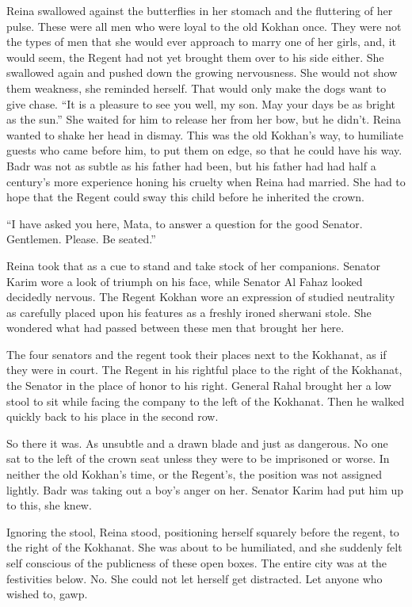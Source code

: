 \documentclass{article}
\begin{document}
	Reina swallowed against the butterflies in her stomach and the fluttering of her pulse. These were all men who were loyal to the old Kokhan once. They were not the types of men that she would ever approach to marry one of her girls, and, it would seem, the Regent had not yet brought them over to his side either. She swallowed again and pushed down the growing nervousness. She would not show them weakness, she reminded herself. That would only make the dogs want to give chase. “It is a pleasure to see you well, my son. May your days be as bright as the sun.” She waited for him to release her from her bow, but he didn’t. Reina wanted to shake her head in dismay. This was the old Kokhan’s way, to humiliate guests who came before him, to put them on edge, so that he could have his way. Badr was not as subtle as his father had been, but his father had had half a century’s more experience honing his cruelty when Reina had married. She had to hope that the Regent could sway this child before he inherited the crown.
	
	“I have asked you here, Mata, to answer a question for the good Senator. Gentlemen. Please. Be seated.”
	
	Reina took that as a cue to stand and take stock of her companions. Senator Karim wore a look of triumph on his face, while Senator Al Fahaz looked decidedly nervous. The Regent Kokhan wore an expression of studied neutrality as carefully placed upon his features as a freshly ironed sherwani stole. She wondered what had passed between these men that brought her here.
	
	The four senators and the regent took their places next to the Kokhanat, as if they were in court. The Regent in his rightful place to the right of the Kokhanat, the Senator in the place of honor to his right. General Rahal brought her a low stool to sit while facing the company to the left of the Kokhanat. Then he walked quickly back to his place in the second row.
	
	So there it was. As unsubtle and a drawn blade and just as dangerous. No one sat to the left of the crown seat unless they were to be imprisoned or worse. In neither the old Kokhan’s time, or the Regent’s, the position was not assigned lightly. Badr was taking out a boy’s anger on her. Senator Karim had put him up to this, she knew. 
	
	Ignoring the stool, Reina stood, positioning herself squarely before the regent, to the right of the Kokhanat. She was about to be humiliated, and she suddenly felt self conscious of the publicness of these open boxes. The entire city was at the festivities below. No. She could not let herself get distracted. Let anyone who wished to, gawp.
	
\end{document}
